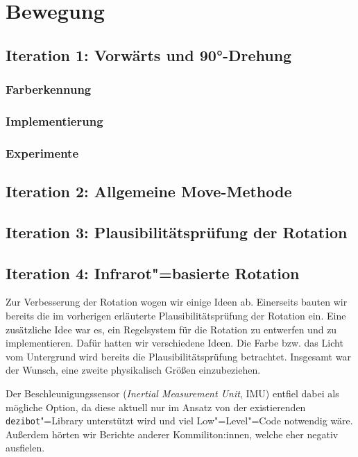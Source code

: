 
\section{Bewegung}

\subsection{Iteration 1: Vorwärts und 90°-Drehung}

\subsubsection{Farberkennung}


\subsubsection{Implementierung}


\subsubsection{Experimente}


\subsection{Iteration 2: Allgemeine Move-Methode}


\subsection{Iteration 3: Plausibilitätsprüfung der Rotation}
\label{sec:plausibility-check-rotation}


\subsection{Iteration 4: Infrarot"=basierte Rotation}
\label{sec:movement-ir}

Zur Verbesserung der Rotation wogen wir einige Ideen ab. Einerseits bauten wir bereits die im vorherigen erläuterte Plausibilitätsprüfung der Rotation ein. Eine zusätzliche Idee war es, ein Regelsystem für die Rotation zu entwerfen und zu implementieren. Dafür hatten wir verschiedene Ideen. Die Farbe bzw. das Licht vom Untergrund wird bereits die Plausibilitätsprüfung betrachtet. Insgesamt war der Wunsch, eine zweite physikalisch Größen einzubeziehen.

Der Beschleunigungssensor (\emph{Inertial Measurement Unit}, IMU) entfiel dabei als mögliche Option, da diese aktuell nur im Ansatz von der existierenden \texttt{dezibot}"=Library unterstützt wird und viel Low"=Level"=Code notwendig wäre. Außerdem hörten wir Berichte anderer Kommiliton:innen, welche eher negativ ausfielen.

